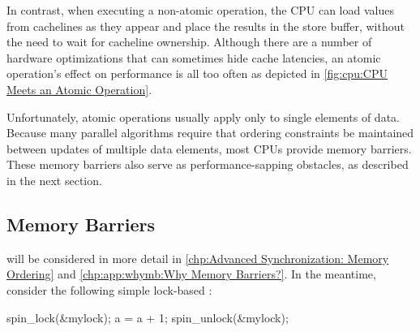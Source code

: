 In contrast, when executing a non-atomic operation, the CPU can load
values from cachelines as they appear and place the results in the
store buffer, without the need to wait for cacheline ownership.
Although there are a number of hardware optimizations that can sometimes
hide cache latencies, an atomic operation's effect on performance is
all too often as depicted in
\cref{fig:cpu:CPU Meets an Atomic Operation}.

Unfortunately, atomic operations usually apply only to single elements
of data.
Because many parallel algorithms require that ordering constraints
be maintained between updates of multiple data elements, most CPUs
provide memory barriers.
These memory barriers also serve as performance-sapping obstacles,
as described in the next section.

\QuickQuizEnd

\subsection{Memory Barriers}
\label{sec:cpu:Memory Barriers}

 will be considered in more detail in
\cref{chp:Advanced Synchronization: Memory Ordering} and
\cref{chp:app:whymb:Why Memory Barriers?}\@.
In the meantime, consider the following simple lock-based :

\begin{VerbatimN}
spin_lock(&mylock);
a = a + 1;
spin_unlock(&mylock);
\end{VerbatimN}

